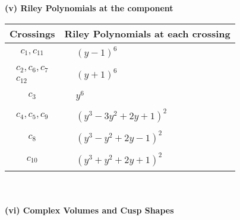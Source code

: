 \documentclass[1p]{elsarticle_modified}
\theoremstyle{definition}
\begin{document}
\newpage\renewcommand{\arraystretch}{1}
\flushleft \textbf{(v) Riley Polynomials at the component}\newline \\
\begin{tabular}{m{50pt}|m{274pt}}
Crossings & \hspace{64pt}Riley Polynomials at each crossing \\
\hline $$\begin{aligned}c_{1},c_{11}\end{aligned}$$&$\begin{aligned}
&(y-1)^6
\end{aligned}$\\
\hline $$\begin{aligned}c_{2},c_{6},c_{7}\\c_{12}\end{aligned}$$&$\begin{aligned}
&(y+1)^6
\end{aligned}$\\
\hline $$\begin{aligned}c_{3}\end{aligned}$$&$\begin{aligned}
&y^6
\end{aligned}$\\
\hline $$\begin{aligned}c_{4},c_{5},c_{9}\end{aligned}$$&$\begin{aligned}
&(y^3-3 y^2+2 y+1)^2
\end{aligned}$\\
\hline $$\begin{aligned}c_{8}\end{aligned}$$&$\begin{aligned}
&(y^3- y^2+2 y-1)^2
\end{aligned}$\\
\hline $$\begin{aligned}c_{10}\end{aligned}$$&$\begin{aligned}
&(y^3+y^2+2 y+1)^2
\end{aligned}$\\
\hline
\end{tabular}\\~\\
\newpage\flushleft \textbf{(vi) Complex Volumes and Cusp Shapes}
\end{document}
